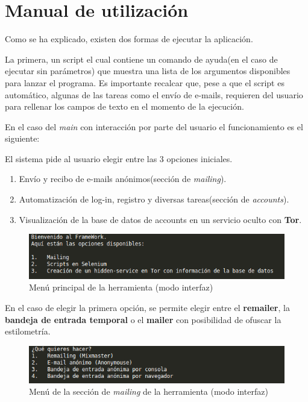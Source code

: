 \chapter{Manual de utilización}
\label{Anexo:manualuso}

Como se ha explicado, existen dos formas de ejecutar la aplicación. 

La primera, un script el cual contiene un comando de ayuda(en el caso de ejecutar sin parámetros) que muestra una lista de los argumentos disponibles para lanzar el programa. Es importante recalcar que, pese a que el script es automático, algunas de las tareas como el envío de e-mails, requieren del usuario para rellenar los campos de texto en el momento de la ejecución.

En el caso del \textit{main} con interacción por parte del usuario el funcionamiento es el siguiente:

El sistema pide al usuario elegir entre las 3 opciones iniciales.
\begin{enumerate}
	\item {Envío y recibo de e-mails anónimos(sección de \textit{mailing}).}
	
	\item {Automatización de log-in, registro y diversas tareas(sección de \textit{accounts})}.
	
	\item {Visualización de la base de datos de accounts en un servicio oculto con \textbf{Tor}}.
\end{enumerate}


\begin{figure}[h]
	\centerline{
		\mbox{\includegraphics[width=5.00in]{images/menu_ini.png}}
	}
	\caption{Menú principal de la herramienta (modo interfaz)}
	\label{fig:inicial}
\end{figure}

En el caso de elegir la primera opción, se permite elegir entre el \textbf{remailer}, la \textbf{bandeja de entrada temporal} o el \textbf{mailer} con posibilidad de ofuscar la estilometría.


\begin{figure}[h]
	\centerline{
		\mbox{\includegraphics[width=5.00in]{images/mailing.png}}
	}
	\caption{Menú de la sección de \textit{mailing} de la herramienta (modo interfaz)}
	\label{fig:mailing}
\end{figure}

